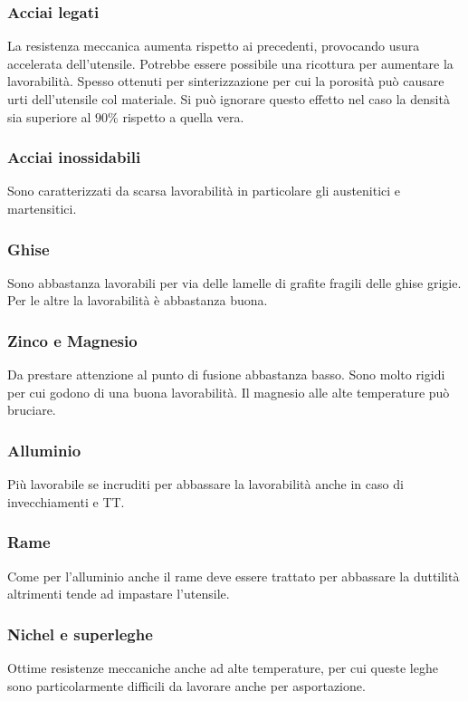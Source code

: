 \subsubsection{Acciai legati}
La resistenza meccanica aumenta rispetto ai precedenti, provocando usura accelerata dell'utensile.
Potrebbe essere possibile una ricottura per aumentare la lavorabilità.
Spesso ottenuti per sinterizzazione per cui la porosità può causare urti dell'utensile col materiale. Si può ignorare questo effetto nel caso la densità sia superiore al $90\%$ rispetto a quella vera.

\subsubsection{Acciai inossidabili}
Sono caratterizzati da scarsa lavorabilità in particolare gli austenitici e martensitici.

\subsubsection{Ghise}
Sono abbastanza lavorabili per via delle lamelle di grafite fragili delle ghise grigie. Per le altre la lavorabilità è abbastanza buona.

\subsubsection{Zinco e Magnesio}
Da prestare attenzione al punto di fusione abbastanza basso. Sono molto rigidi per cui godono di una buona lavorabilità.
Il magnesio alle alte temperature può bruciare.

\subsubsection{Alluminio}
Più lavorabile se incruditi per abbassare la lavorabilità anche in caso di invecchiamenti e \ac{TT}.

\subsubsection{Rame}
Come per l'alluminio anche il rame deve essere trattato per abbassare la duttilità altrimenti tende ad impastare l'utensile.

\subsubsection{Nichel e superleghe}
Ottime resistenze meccaniche anche ad alte temperature, per cui queste leghe sono particolarmente difficili da lavorare anche per asportazione.

